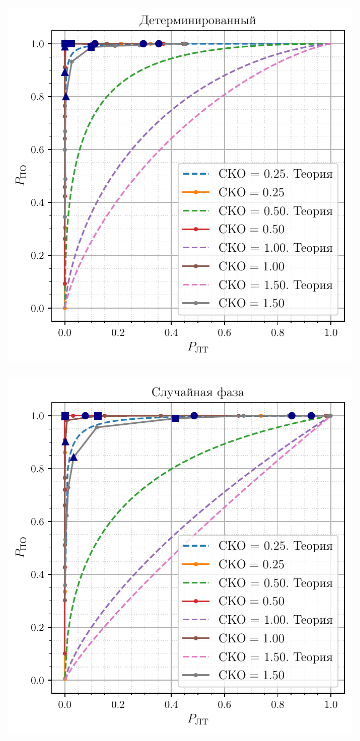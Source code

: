 \begin{figure}[H]
    \centering
    \begin{subfigure}{0.49\linewidth}
        \includegraphics[width=\linewidth]{data/data_determ.pdf}
    \end{subfigure}
    \begin{subfigure}{0.49\linewidth}
        \includegraphics[width=\linewidth]{data/data_phase.pdf}
    \end{subfigure}
\end{figure}
